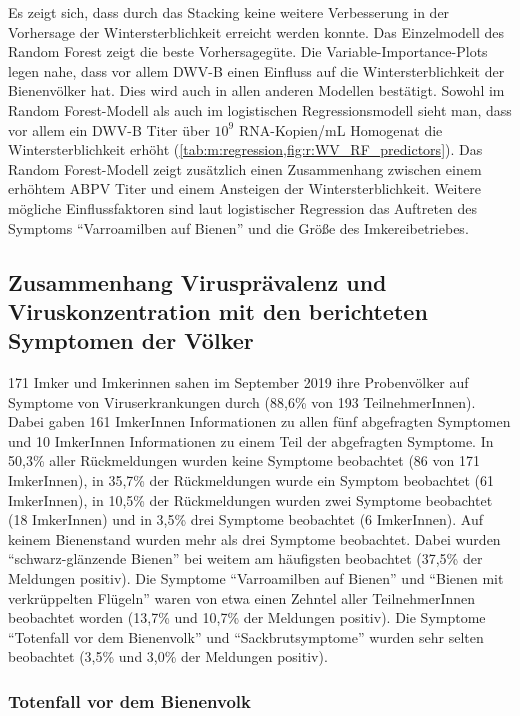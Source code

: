 
 
 Es zeigt sich, dass durch das Stacking keine weitere Verbesserung in der Vorhersage der Wintersterblichkeit erreicht werden konnte. Das Einzelmodell des Random Forest zeigt die beste Vorhersagegüte. Die Variable-Importance-Plots legen nahe, dass vor allem DWV-B einen Einfluss auf die Wintersterblichkeit der Bienenvölker hat. Dies wird auch in allen anderen Modellen bestätigt. Sowohl im Random Forest-Modell als auch im logistischen Regressionsmodell sieht man, dass vor allem ein DWV-B Titer über $10^9$ RNA-Kopien/\si{\milli\liter} Homogenat die Wintersterblichkeit erhöht (\cref{tab:m:regression,fig:r:WV_RF_predictors}). Das Random Forest-Modell zeigt zusätzlich einen Zusammenhang zwischen einem erhöhtem ABPV Titer und einem Ansteigen der Wintersterblichkeit. Weitere mögliche Einflussfaktoren sind laut logistischer Regression das Auftreten des Symptoms \enquote{Varroamilben auf Bienen} und die Größe des Imkereibetriebes.
 
 
\subsection{Zusammenhang Virusprävalenz und Viruskonzentration mit den berichteten Symptomen der Völker} \label{chap:egebnisse:symptome}

171 Imker und Imkerinnen sahen im September 2019 ihre Probenvölker auf Symptome von Viruserkrankungen durch (88,6\% von 193 TeilnehmerInnen). Dabei gaben 161 ImkerInnen Informationen zu allen fünf abgefragten Symptomen und 10 ImkerInnen Informationen zu einem Teil der abgefragten Symptome. In 50,3\% aller Rückmeldungen wurden keine Symptome beobachtet (86 von 171 ImkerInnen), in 35,7\% der Rückmeldungen wurde ein Symptom beobachtet (61 ImkerInnen), in 10,5\% der Rückmeldungen wurden zwei Symptome beobachtet (18 ImkerInnen) und in 3,5\% drei Symptome beobachtet (6 ImkerInnen). Auf keinem Bienenstand wurden mehr als drei Symptome beobachtet.
Dabei wurden \enquote{schwarz-glänzende Bienen} bei weitem am häufigsten beobachtet (37,5\% der Meldungen positiv). Die Symptome \enquote{Varroamilben auf Bienen} und \enquote{Bienen mit verkrüppelten Flügeln} waren von etwa einen Zehntel aller TeilnehmerInnen beobachtet worden (13,7\% und 10,7\% der Meldungen positiv). Die Symptome \enquote{Totenfall vor dem Bienenvolk} und \enquote{Sackbrutsymptome} wurden sehr selten beobachtet (3,5\% und 3,0\% der Meldungen positiv).

\subsubsection{Totenfall vor dem Bienenvolk}


